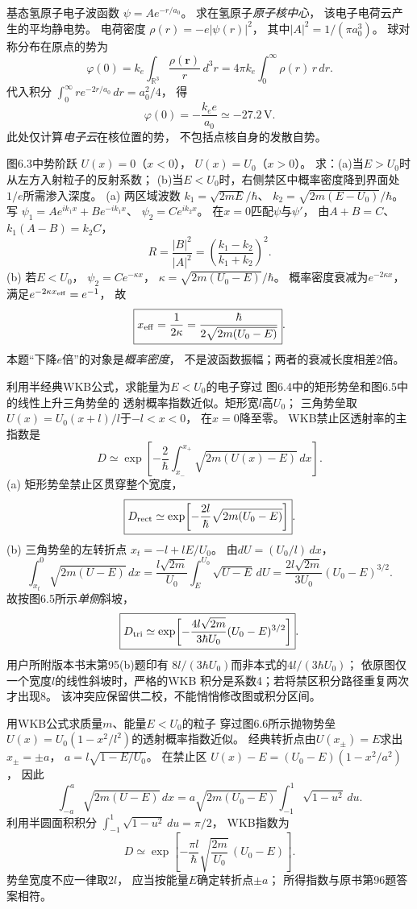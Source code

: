 基态氢原子电子波函数
$\psi=Ae^{-r/a_0}$。
求在氢原子\emph{原子核中心}，
该电子电荷云产生的平均静电势。
\exsolution
电荷密度
$\rho(r)=-e|\psi(r)|^2$，
其中$|A|^2=1/(\pi a_0^3)$。
球对称分布在原点的势为
\[
 \varphi(0)=k_e\int_{\mathbb R^3}
 \frac{\rho(\boldsymbol r)}r\,d^3r
 =4\pi k_e\int_0^\infty \rho(r)\,r\,dr.
\]
代入积分
$\int_0^\infty r e^{-2r/a_0}\,dr=a_0^2/4$，
得
\[
 \boxed{\varphi(0)=-\frac{k_ee}{a_0}
 \simeq-27.2\,\mathrm V}.
\]
\excheck 此处仅计算\emph{电子云}在核位置的势，
不包括点核自身的发散自势。

图6.3中势阶跃
$U(x)=0$（$x<0$），
$U(x)=U_0$（$x>0$）。
求：(a)当$E>U_0$时从左方入射粒子的反射系数；
(b)当$E<U_0$时，右侧禁区中概率密度降到界面处
$1/e$所需渗入深度。
\exsolution
(a) 两区域波数
$k_1=\sqrt{2mE}/\hbar$、
$k_2=\sqrt{2m(E-U_0)}/\hbar$。
写
$\psi_1=Ae^{ik_1x}+Be^{-ik_1x}$、
$\psi_2=Ce^{ik_2x}$。
在$x=0$匹配$\psi$与$\psi'$，
由$A+B=C$、
$k_1(A-B)=k_2C$，
\[
 \boxed{R=\frac{|B|^2}{|A|^2}
 =\left(\frac{k_1-k_2}{k_1+k_2}\right)^2}.
\]
(b) 若$E<U_0$，
$\psi_2=C e^{-\kappa x}$，
$\kappa=\sqrt{2m(U_0-E)}/\hbar$。
概率密度衰减为$e^{-2\kappa x}$，
满足$e^{-2\kappa x_{\rm eff}}=e^{-1}$，
故
\[
 \boxed{x_{\rm eff}=\frac1{2\kappa}
 =\frac{\hbar}{2\sqrt{2m(U_0-E)}}}.
\]
\excheck 本题“下降$e$倍”的对象是\emph{概率密度}，
不是波函数振幅；两者的衰减长度相差2倍。

利用半经典WKB公式，求能量为$E<U_0$的电子穿过
图6.4中的矩形势垒和图6.5中的线性上升三角势垒的
透射概率指数近似。矩形宽$l$高$U_0$；
三角势垒取$U(x)=U_0(x+l)/l$于$-l<x<0$，
在$x=0$降至零。
\exsolution
WKB禁止区透射率的主指数是
\[
 D\simeq\exp\!\left[-\frac2\hbar
 \int_{x_-}^{x_+}\sqrt{2m(U(x)-E)}\,dx\right].
\]
(a) 矩形势垒禁止区贯穿整个宽度，
\[
 \boxed{D_{\rm rect}\simeq
 \exp\!\left[-\frac{2l}{\hbar}\sqrt{2m(U_0-E)}\right]}.
\]
(b) 三角势垒的左转折点
$x_t=-l+lE/U_0$。
由$dU=(U_0/l)\,dx$，
\[
 \int_{x_t}^{0}\sqrt{2m(U-E)}\,dx
 =\frac{l\sqrt{2m}}{U_0}
 \int_E^{U_0}\sqrt{U-E}\,dU
 =\frac{2l\sqrt{2m}}{3U_0}(U_0-E)^{3/2}.
\]
故按图6.5所示\emph{单侧}斜坡，
\[
 \boxed{D_{\rm tri}\simeq
 \exp\!\left[-\frac{4l\sqrt{2m}}{3\hbar U_0}
 (U_0-E)^{3/2}\right]}.
\]
\excheck 用户所附版本书末第95(b)题印有
$8l/(3\hbar U_0)$而非本式的$4l/(3\hbar U_0)$；
依原图仅一个宽度$l$的线性斜坡时，严格的WKB
积分是系数4；若将禁区积分路径重复两次才出现8。
该冲突应保留供二校，不能悄悄修改图或积分区间。

用WKB公式求质量$m$、能量$E<U_0$的粒子
穿过图6.6所示抛物势垒
$U(x)=U_0(1-x^2/l^2)$的透射概率指数近似。
\exsolution
经典转折点由$U(x_\pm)=E$求出
$x_\pm=\pm a$，
$a=l\sqrt{1-E/U_0}$。
在禁止区
$U(x)-E=(U_0-E)(1-x^2/a^2)$，
因此
\[
 \int_{-a}^{a}\sqrt{2m(U-E)}\,dx
 =a\sqrt{2m(U_0-E)}
 \int_{-1}^{1}\sqrt{1-u^2}\,du.
\]
利用半圆面积积分
$\int_{-1}^{1}\sqrt{1-u^2}\,du=\pi/2$，
WKB指数为
\[
 \boxed{D\simeq
 \exp\!\left[-\frac{\pi l}{\hbar}
 \sqrt{\frac{2m}{U_0}}\,(U_0-E)\right]}.
\]
\excheck 势垒宽度不应一律取$2l$，
应当按能量$E$确定转折点$\pm a$；
所得指数与原书第96题答案相符。
